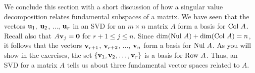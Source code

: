 \label{sec:svd_mtx_spaces}

We conclude this section with a short discussion of how a singular value decomposition relates fundamental subspaces of a matrix. We have seen that the vectors $\mathbf{u}_1$, $\mathbf{u}_2$, $\ldots$, $\mathbf{u}_r$ in an SVD for an $m \times n$ matrix $A$ form a basis for $\text{Col } A$. Recall also that $A \mathbf{v}_j = \mathbf{0}$ for $r+1 \leq j \leq n$. Since $\dim(\text{Nul } A) + \dim(\text{Col } A) = n$, it follows that the vectors $\mathbf{v}_{r+1}$, $\mathbf{v}_{r+2}$, $\ldots$, $\mathbf{v}_n$ form a basis for $\text{Nul } A$.  As you will show in the exercises, the set $\{\mathbf{v}_1, \mathbf{v}_2, \ldots, \mathbf{v}_r\}$ is a basis for $\text{Row } A$.  Thus, an SVD for a matrix $A$ tells us about three fundamental vector spaces related to $A$.




